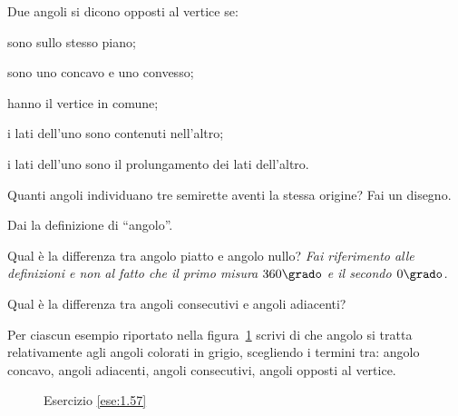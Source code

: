 \pagebreak

\begin{esercizio}
\label{ese:1.52}
Due angoli si dicono opposti al vertice se:
\begin{enumeratea}
\item sono sullo stesso piano;
\item sono uno concavo e uno convesso;
\item hanno il vertice in comune;
\item i lati dell'uno sono contenuti nell'altro;
\item i lati dell'uno sono il prolungamento dei lati dell'altro.
\end{enumeratea}
\end{esercizio}

\begin{esercizio}
\label{ese:1.53}
Quanti angoli individuano tre semirette aventi la stessa origine? Fai 
un disegno.
\end{esercizio}

\begin{esercizio}
\label{ese:1.54}
Dai la definizione di ``angolo''.
\end{esercizio}

\begin{esercizio}
\label{ese:1.55}
Qual è la differenza tra angolo piatto e angolo nullo? \emph{Fai 
riferimento alle definizioni e non al fatto che il primo misura 
\(360\grado\) e il secondo \(0\grado\).}
\end{esercizio}

\begin{esercizio}
\label{ese:1.56}
Qual è la differenza tra angoli consecutivi e angoli adiacenti?
\end{esercizio}

\begin{esercizio}
\label{ese:1.57}
Per ciascun esempio riportato nella figura~\ref{fig:ese1.57} scrivi 
di che angolo si tratta relativamente agli angoli colorati in grigio, 
scegliendo i termini tra: angolo concavo, angoli adiacenti, angoli 
consecutivi, angoli opposti al vertice.
\end{esercizio}


\begin{inaccessibleblock}
 \begin{figure}[htb]
 \centering
 \caption{Esercizio \ref{ese:1.57}}\label{fig:ese1.57}
\end{figure}
\end{inaccessibleblock}

